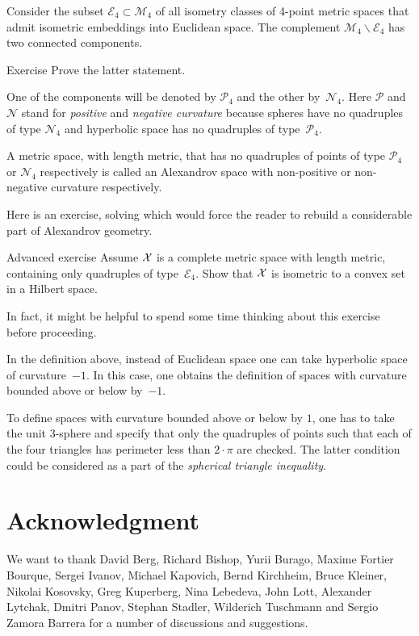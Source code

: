 Consider the subset $\mathcal{E}_4\subset \mathcal{M}_4$ of all isometry classes of 4-point metric spaces that admit isometric embeddings into Euclidean space.
The complement $\mathcal{M}_4\backslash \mathcal{E}_4$ has two connected components.

\begin{thm}{Exercise}\label{ex:two-components-of-M4}
Prove the latter statement.
\end{thm}


One of the components will be denoted by $\mathcal{P}_4$ and the other by~$\mathcal{N}_4$.
Here $\mathcal{P}$ and $\mathcal{N}$ stand for {}\emph{positive} 
and {}\emph{negative curvature} because spheres have no quadruples of type $\mathcal{N}_4$ and 
hyperbolic space
has no quadruples of type~$\mathcal{P}_4$.

A metric space, with length metric, 
that has no quadruples of points of type $\mathcal{P}_4$ or $\mathcal{N}_4$
respectively 
is called an Alexandrov space with non-positive or non-negative curvature respectively.

Here is an exercise, solving which would force the reader to rebuild a considerable part of Alexandrov geometry.

\begin{thm}{Advanced exercise}\label{ex:convex-set}
Assume $\mathcal{X}$ is a complete metric space with length metric, 
containing only quadruples of type~$\mathcal{E}_4$.
Show that $\mathcal{X}$ is isometric to a convex set in a Hilbert space.
\end{thm}

In fact, it might be helpful to spend some time thinking about this exercise before proceeding.

In the definition above, 
instead of  Euclidean space 
one can take  
hyperbolic space of curvature~$-1$.
In this case,
one obtains the definition of spaces with curvature bounded above or below by~$-1$.

To define spaces with curvature bounded above or below by $1$,
one has to take the unit 3-sphere 
and specify that only the quadruples of points such that each of the four triangles has perimeter 
less than $2\cdot\pi$ are checked.
The latter condition could be considered as a part of the {}\emph{spherical triangle inequality}.


\section*{Acknowledgment}
We want to  thank 
David Berg,
Richard Bishop,
Yurii Burago,
Maxime Fortier Bourque,
Sergei Ivanov,
Michael Kapovich, 
Bernd Kirchheim, 
Bruce Kleiner,
Nikolai Kosovsky,
Greg Kuperberg,
Nina Lebedeva,
John Lott,
Alexander Lytchak,
Dmitri Panov,
Stephan Stadler,
Wilderich Tuschmann
and 
Sergio Zamora Barrera
for a number of discussions and suggestions.

